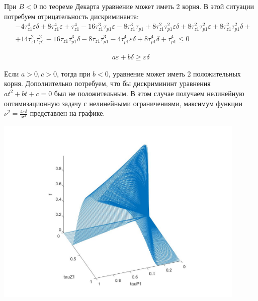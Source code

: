 \documentclass[a4paper,14pt]{extarticle} %
\begin{document}
При $B < 0$ по теореме Декарта уравнение может иметь 2 корня. В этой ситуации потребуем отрицательность дискриминанта:
  \begin{equation}
 \begin{aligned}
&-4\tau_{z1}^4 \varepsilon \delta + 8\tau_{z1}^4 \varepsilon + \tau_{z1}^4 - 16\tau_{z1}^3 \tau_{p1} \varepsilon - 8\tau_{z1}^3 \tau_{p1} + 8\tau_{z1}^2 \tau_{p1}^2 \varepsilon \delta + 8\tau_{z1}^2 \tau_{p1}^2 \varepsilon + 8\tau_{z1}^2 \tau_{p1}^2 \delta + \\
& + 14\tau_{z1}^2 \tau_{p1}^2 - 16\tau_{z1} \tau_{p1}^3 \delta - 8\tau_{z1} \tau_{p1}^3 - 4\tau_{p1}^4 \varepsilon \delta + 8\tau_{p1}^4 \delta + \tau_{p1}^4 \leq 0
 \end{aligned}
\end{equation}

  \begin{equation}
 \begin{aligned}
a\varepsilon + b\delta \geq \varepsilon\delta
 \end{aligned}
\end{equation}

Если $a > 0, c > 0$, тогда  при $b < 0$, уравнение может иметь 2 положительных корня. Дополнительно потребуем, что бы дискримининт уравнения $at^2 + bt +c = 0$ был не положительным. В этом случае получаем нелинейную оптимизационную задачу с нелинейными ограничениями, максимум функции $\nu^2 = \frac{4\varepsilon\delta}{\varkappa^2}$ представлен на графике.

\includegraphics[width=12cm]{images/filter2_tau0_1.jpg}\\
\end{document}
